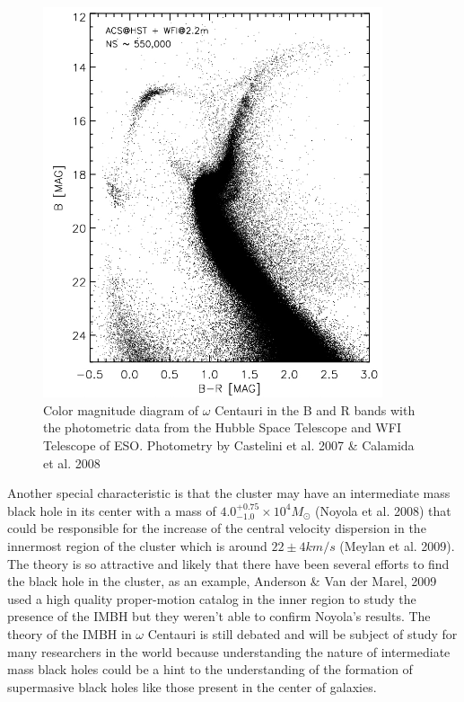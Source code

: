 \begin{figure}[H]
\centering
\includegraphics[width=10cm]{images/ngc5139_2.jpg}
\caption[Ever]{Color magnitude diagram of $\omega$ Centauri in the B and R bands with the photometric data from the Hubble Space Telescope and WFI Telescope of ESO. Photometry by Castelini et al. 2007 \& Calamida et al. 2008}
\end{figure}

Another special characteristic is that the cluster may have an intermediate mass black hole in its center with a mass of $4.0^{+0.75}_{-1.0} \times 10^{4} M_{\odot}$ (Noyola et al. 2008) that could be responsible for the increase of the central velocity dispersion in the innermost region of the cluster which is around $22 \pm 4km/s$ (Meylan et al. 2009). The theory is so attractive and likely that there have been several efforts to find the black hole in the cluster, as an example, Anderson \& Van der Marel, 2009 used a high quality proper-motion catalog in the inner region to study the presence of the IMBH but they weren't able to confirm Noyola's results. The theory of the IMBH in $\omega$ Centauri is still debated and will be subject of study for many researchers in the world because understanding the nature of intermediate mass black holes could be a hint to the understanding of the formation of supermasive black holes like those present in the center of galaxies.

